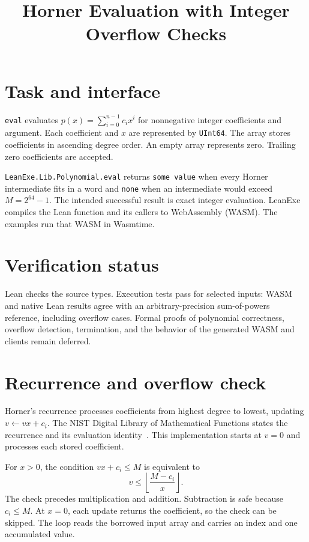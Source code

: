 
\title{Horner Evaluation with Integer Overflow Checks}

\maketitle

\section{Task and interface}
\texttt{eval} evaluates $p(x)=\sum_{i=0}^{n-1}c_i x^i$ for nonnegative integer
coefficients and argument.  Each coefficient and $x$ are represented by
\texttt{UInt64}.  The array stores coefficients in ascending degree order.
An empty array represents zero.  Trailing zero coefficients are accepted.

\texttt{LeanExe.Lib.Polynomial.eval} returns \texttt{some value} when every
Horner intermediate fits in a word and \texttt{none} when an intermediate
would exceed $M=2^{64}-1$.  The intended successful result is exact integer
evaluation.  LeanExe compiles the Lean function and its callers to WebAssembly
(WASM).  The examples run that WASM in Wasmtime.

\section{Verification status}
Lean checks the source types.  Execution tests pass for selected inputs:
WASM and native Lean results agree with an arbitrary-precision sum-of-powers
reference, including overflow cases.  Formal proofs of polynomial correctness,
overflow detection, termination, and the behavior of the generated WASM and
clients remain deferred.

\section{Recurrence and overflow check}
Horner's recurrence processes coefficients from highest degree to lowest,
updating $v\leftarrow vx+c_i$.  The NIST Digital Library of Mathematical
Functions states the recurrence and its evaluation identity~\cite{horner}.
This implementation starts at $v=0$ and processes each stored coefficient.

For $x>0$, the condition $vx+c_i\leq M$ is equivalent to
\[
  v\leq\left\lfloor\frac{M-c_i}{x}\right\rfloor.
\]
The check precedes multiplication and addition.  Subtraction is safe because
$c_i\leq M$.  At $x=0$, each update returns the coefficient, so the check can
be skipped.  The loop reads the borrowed input array and carries an index
and one accumulated value.

